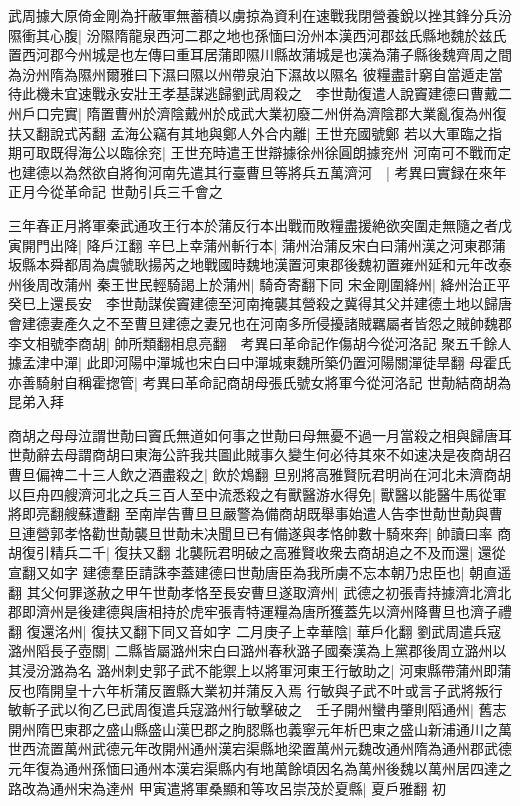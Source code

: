 武周據大原倚金剛為扞蔽軍無蓄積以虜掠為資利在速戰我閉營養銳以挫其鋒分兵汾隰衝其心腹|{
	汾隰隋龍泉西河二郡之地也孫愐曰汾州本漢西河郡兹氏縣地魏於兹氏置西河郡今州城是也左傳曰重耳居蒲即隰川縣故蒲城是也漢為蒲子縣後魏齊周之間為汾州隋為隰州爾雅曰下濕曰隰以州帶泉泊下濕故以隰名}
彼糧盡計窮自當遁走當待此機未宜速戰永安壯王孝基謀逃歸劉武周殺之　李世勣復遣人說竇建德曰曹戴二州戶口完實|{
	隋置曹州於濟陰戴州於成武大業初廢二州併為濟陰郡大業亂復為州復扶又翻說式芮翻}
孟海公竊有其地與鄭人外合内離|{
	王世充國號鄭}
若以大軍臨之指期可取既得海公以臨徐兖|{
	王世充時遣王世辯據徐州徐圓朗據兖州}
河南可不戰而定也建德以為然欲自將徇河南先遣其行臺曹旦等將兵五萬濟河　|{
	考異曰實録在來年正月今從革命記}
世勣引兵三千會之

三年春正月將軍秦武通攻王行本於蒲反行本出戰而敗糧盡援絶欲突圍走無隨之者戊寅開門出降|{
	降戶江翻}
辛巳上幸蒲州斬行本|{
	蒲州治蒲反宋白曰蒲州漢之河東郡蒲坂縣本舜都周為虞虢耿揚芮之地戰國時魏地漢置河東郡後魏初置雍州延和元年改泰州後周改蒲州}
秦王世民輕騎謁上於蒲州|{
	騎奇寄翻下同}
宋金剛圍絳州|{
	絳州治正平}
癸巳上還長安　李世勣謀俟竇建德至河南掩襲其營殺之冀得其父并建德土地以歸唐會建德妻產久之不至曹旦建德之妻兄也在河南多所侵擾諸賊羈屬者皆怨之賊帥魏郡李文相號李商胡|{
	帥所類翻相息亮翻　考異曰革命記作傷胡今從河洛記}
聚五千餘人據孟津中潬|{
	此即河陽中潬城也宋白曰中潬城東魏所築仍置河陽關潬徒旱翻}
母霍氏亦善騎射自稱霍揔管|{
	考異曰革命記商胡母張氏號女將軍今從河洛記}
世勣結商胡為昆弟入拜

商胡之母母泣謂世勣曰竇氏無道如何事之世勣曰母無憂不過一月當殺之相與歸唐耳世勣辭去母謂商胡曰東海公許我共圖此賊事久變生何必待其來不如速决是夜商胡召曹旦偏禆二十三人飲之酒盡殺之|{
	飲於鴆翻}
旦别將高雅賢阮君明尚在河北未濟商胡以巨舟四艘濟河北之兵三百人至中流悉殺之有獸醫游水得免|{
	獸醫以能醫牛馬從軍將即亮翻艘蘇遭翻}
至南岸告曹旦旦嚴警為備商胡既舉事始遣人告李世勣世勣與曹旦連營郭孝恪勸世勣襲旦世勣未决聞旦已有備遂與孝恪帥數十騎來奔|{
	帥讀曰率}
商胡復引精兵二千|{
	復扶又翻}
北襲阮君明破之高雅賢收衆去商胡追之不及而還|{
	還從宣翻又如字}
建德羣臣請誅李蓋建德曰世勣唐臣為我所虜不忘本朝乃忠臣也|{
	朝直遥翻}
其父何罪遂赦之甲午世勣孝恪至長安曹旦遂取濟州|{
	武德之初張青持據濟北濟北郡即濟州是後建德與唐相持於虎牢張青特運糧為唐所獲蓋先以濟州降曹旦也濟子禮翻}
復還洺州|{
	復扶又翻下同又音如字}
二月庚子上幸華陰|{
	華戶化翻}
劉武周遣兵寇潞州䧟長子壺關|{
	二縣皆屬潞州宋白曰潞州春秋潞子國秦漢為上黨郡後周立潞州以其浸汾潞為名}
潞州刺史郭子武不能禦上以將軍河東王行敏助之|{
	河東縣帶蒲州即蒲反也隋開皇十六年析蒲反置縣大業初并蒲反入焉}
行敏與子武不叶或言子武將叛行敏斬子武以徇乙巳武周復遣兵寇潞州行敏擊破之　壬子開州蠻冉肇則䧟通州|{
	舊志開州隋巴東郡之盛山縣盛山漢巴郡之朐䏰縣也義寧元年析巴東之盛山新浦通川之萬世西流置萬州武德元年改開州通州漢宕渠縣地梁置萬州元魏改通州隋為通州郡武德元年復為通州孫愐曰通州本漢宕渠縣内有地萬餘頃因名為萬州後魏以萬州居四達之路改為通州宋為達州}
甲寅遣將軍桑顯和等攻呂崇茂於夏縣|{
	夏戶雅翻}
初

